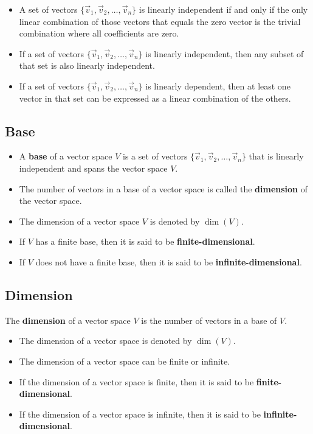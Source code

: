 \begin{itemize}[label=\(-\)]
	\item A set of vectors \(\{\vec{v}_1, \vec{v}_2, \ldots, \vec{v}_n\}\) is linearly independent if and only if the only linear combination of those vectors that equals the zero vector is the trivial combination where all coefficients are zero.
	\item If a set of vectors \(\{\vec{v}_1, \vec{v}_2, \ldots, \vec{v}_n\}\) is linearly independent, then any subset of that set is also linearly independent.
	\item If a set of vectors \(\{\vec{v}_1, \vec{v}_2, \ldots, \vec{v}_n\}\) is linearly dependent, then at least one vector in that set can be expressed as a linear combination of the others.
\end{itemize}

\subsection{Base}

\begin{itemize}[label=\(-\)]
\item A \textbf{base} of a vector space \(V\) is a set of vectors \(\{\vec{v}_1, \vec{v}_2, \ldots, \vec{v}_n\}\) that is linearly independent and spans the vector space \(V\).
\item The number of vectors in a base of a vector space is called the \textbf{dimension} of the vector space.
\item The dimension of a vector space \(V\) is denoted by \(\dim(V)\).
\item If \(V\) has a finite base, then it is said to be \textbf{finite-dimensional}.
\item If \(V\) does not have a finite base, then it is said to be \textbf{infinite-dimensional}.
\end{itemize}

\subsection{Dimension}
The \textbf{dimension} of a vector space \(V\) is the number of vectors in a base of \(V\).

\begin{itemize}[label=\(-\)]
	\item The dimension of a vector space is denoted by \(\dim(V)\).
	\item The dimension of a vector space can be finite or infinite.
	\item If the dimension of a vector space is finite, then it is said to be \textbf{finite-dimensional}.
	\item If the dimension of a vector space is infinite, then it is said to be \textbf{infinite-dimensional}.
\end{itemize}

